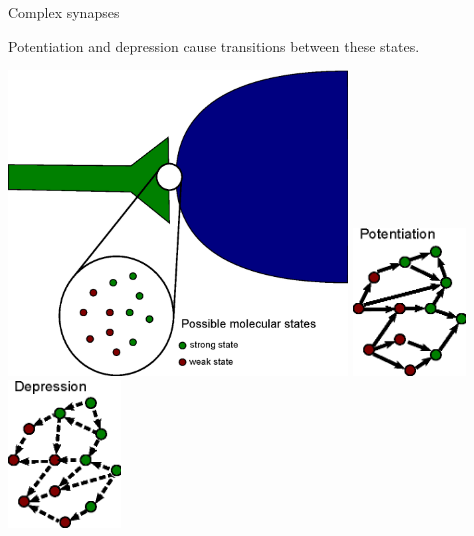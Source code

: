 \documentclass[final,hyperref={pdfpagelabels=false,bookmarks=false}]{beamer}
\begin{document}
\begin{frame}{}
\begin{columns}[t]
\begin{column}{0.27\linewidth}
\begin{block}{Complex synapses}
\begin{minipage}[b]{10cm}
 \vp Potentiation and depression cause transitions between these states.
\end{minipage}
 \vp
\parbox[c]{25cm}{
\includegraphics[width=9cm]{synapse.eps}
\hfill%
 \includegraphics[width=3cm]{pot.eps}
 \hspace{2cm}
 \includegraphics[width=3cm]{dep.eps}
}
%
\end{block}



\end{column}
\end{columns}
\end{frame}
\end{document}
